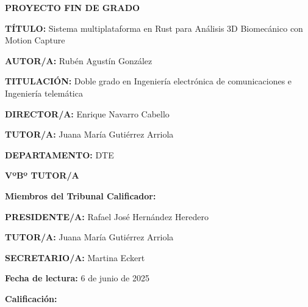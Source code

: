 \vspace{7cm}
\begin{center}
	{\fontsize{20}{24} \textbf{PROYECTO FIN DE GRADO} } \\
	
\end{center}
\vspace{1,3cm}
\begin{adjustwidth}{4cm}{3cm}
	{\setlength{\parskip}{0pt} \setlength{\parindent}{0pt}

{\fontsize{11}{13,2}
	{\textbf{TÍTULO:} Sistema multiplataforma en Rust para Análisis 3D Biomecánico con Motion Capture}\vspace{19pt}
	
	{\textbf{AUTOR/A:} Rubén Agustín González }\vspace{19pt}
	
	{\textbf{TITULACIÓN:} Doble grado en Ingeniería electrónica de comunicaciones e Ingeniería telemática }\vspace{19pt}
	
	{\textbf{DIRECTOR/A:} Enrique Navarro Cabello } \vspace{19pt}
	
	{\textbf{TUTOR/A:} Juana María Gutiérrez Arriola} \vspace{19pt}
	
	{\textbf{DEPARTAMENTO:} DTE}\vspace{19pt}
	
	\hspace*{\fill}	{\textbf{VºBº TUTOR/A}  }\vspace{17pt}
	
	{\textbf{Miembros del Tribunal Calificador:}}\vspace{19pt}
	
	{\textbf{PRESIDENTE/A:} Rafael José Hernández Heredero}\vspace{19pt}
	
	{\textbf{TUTOR/A:} Juana María Gutiérrez Arriola}\vspace{19pt}
	
	{\textbf{SECRETARIO/A:} Martina Eckert}\vspace{19pt}
	
	{\textbf{Fecha de lectura:} 6 de junio de 2025}\vspace{19pt}
	
	{\textbf{Calificación:} }\vspace{19pt}
	
	\vspace{19pt}
}
}
\end{adjustwidth}

\restoregeometry